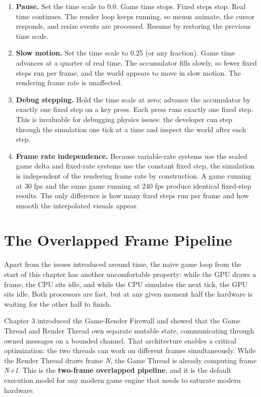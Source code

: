 \documentclass[
  11pt,
  letterpaper,
  DIV=11,
  numbers=noendperiod,
  twoside,
  open=right]{scrreprt}
\begin{document}
\begin{enumerate}
\def\labelenumi{\arabic{enumi}.}
\item
  \textbf{Pause.} Set the time scale to 0.0. Game time stops. Fixed
  steps stop. Real time continues. The render loop keeps running, so
  menus animate, the cursor responds, and resize events are processed.
  Resume by restoring the previous time scale.
\item
  \textbf{Slow motion.} Set the time scale to 0.25 (or any fraction).
  Game time advances at a quarter of real time. The accumulator fills
  slowly, so fewer fixed steps run per frame, and the world appears to
  move in slow motion. The rendering frame rate is unaffected.
\item
  \textbf{Debug stepping.} Hold the time scale at zero; advance the
  accumulator by exactly one fixed step on a key press. Each press runs
  exactly one fixed step. This is invaluable for debugging physics
  issues: the developer can step through the simulation one tick at a
  time and inspect the world after each step.
\item
  \textbf{Frame rate independence.} Because variable-rate systems use
  the scaled game delta and fixed-rate systems use the constant fixed
  step, the simulation is independent of the rendering frame rate by
  construction. A game running at 30 fps and the same game running at
  240 fps produce identical fixed-step results. The only difference is
  how many fixed steps run per frame and how smooth the interpolated
  visuals appear.
\end{enumerate}

\section{The Overlapped Frame
Pipeline}\label{the-overlapped-frame-pipeline}

Apart from the issues introduced around time, the naive game loop from
the start of this chapter has another uncomfortable property: while the
GPU draws a frame, the CPU sits idle, and while the CPU simulates the
next tick, the GPU sits idle. Both processors are fast, but at any given
moment half the hardware is waiting for the other half to finish.

Chapter 3 introduced the Game-Render Firewall and showed that the Game
Thread and Render Thread own separate mutable state, communicating
through owned messages on a bounded channel. That architecture enables a
critical optimization: the two threads can work on different frames
simultaneously. While the Render Thread draws frame \emph{N}, the Game
Thread is already computing frame \emph{N+1}. This is the
\textbf{two-frame overlapped pipeline}, and it is the default execution
model for any modern game engine that needs to saturate modern hardware.
\end{document}
